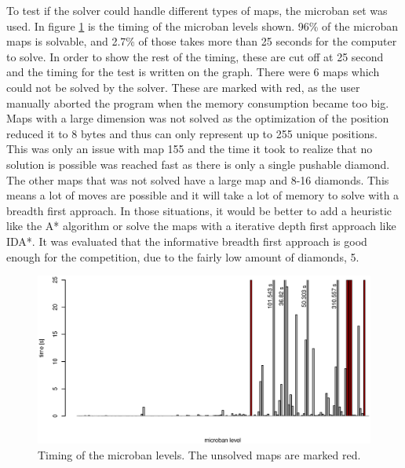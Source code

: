 To test if the solver could handle different types of maps, the microban set was used.
In figure \ref{fig:microban_timing} is the timing of the microban levels shown.
96\% of the microban maps is solvable, and 2.7\% of those takes more than 25 seconds for the computer to solve.
In order to show the rest of the timing, these are cut off at 25 second and the timing for the test is written on the graph.
There were 6 maps which could not be solved by the solver. These are marked with red, as the user manually aborted the program when the memory consumption became too big.
Maps with a large dimension was not solved as the optimization of the position reduced it to 8 bytes and thus can only represent up to 255 unique positions.
This was only an issue with map 155 and the time it took to realize that no solution is possible was reached fast as there is only a single pushable diamond.
The other maps that was not solved have a large map and 8-16 diamonds. 
This means a lot of moves are possible and it will take a lot of memory to solve with a breadth first approach.
In those situations, it would be better to add a heuristic like the A* algorithm or solve the maps with a iterative depth first approach like IDA*.
It was evaluated that the informative breadth first approach is good enough for the competition, due to the fairly low amount of diamonds, 5.

\begin{figure}[h]
 \centering
 \includegraphics[width=\textwidth]{img/micoban_timing.eps}
 \caption{Timing of the microban levels. The unsolved maps are marked red.}
 \label{fig:microban_timing}
\end{figure}
